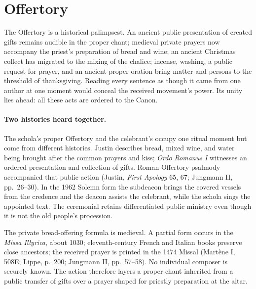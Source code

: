 \section{Offertory}

The Offertory is a historical palimpsest. An ancient public presentation of created gifts remains audible in the proper chant; medieval private prayers now accompany the priest's preparation of bread and wine; an ancient Christmas collect has migrated to the mixing of the chalice; incense, washing, a public request for prayer, and an ancient proper oration bring matter and persons to the threshold of thanksgiving. Reading every sentence as though it came from one author at one moment would conceal the received movement's power. Its unity lies ahead: all these acts are ordered to the Canon.


\paragraph{Two histories heard together.}

The schola's proper Offertory and the celebrant's  occupy one ritual moment but come from different histories. Justin describes bread, mixed wine, and water being brought after the common prayers and kiss; \emph{Ordo Romanus I} witnesses an ordered presentation and collection of gifts. Roman Offertory psalmody accompanied that public action (Justin, \emph{First Apology} 65, 67; Jungmann II, pp.~26--30). In the 1962 Solemn form the subdeacon brings the covered vessels from the credence and the deacon assists the celebrant, while the schola sings the appointed text. The ceremonial retains differentiated public ministry even though it is not the old people's procession.

The private bread-offering formula is medieval. A partial form occurs in the \emph{Missa Illyrica}, about 1030; eleventh-century French and Italian books preserve close ancestors; the received prayer is printed in the 1474 Missal (Mart\`ene I, 508E; Lippe, p.~200; Jungmann II, pp.~57--58). No individual composer is securely known. The action therefore layers a proper chant inherited from a public transfer of gifts over a prayer shaped for priestly preparation at the altar.

